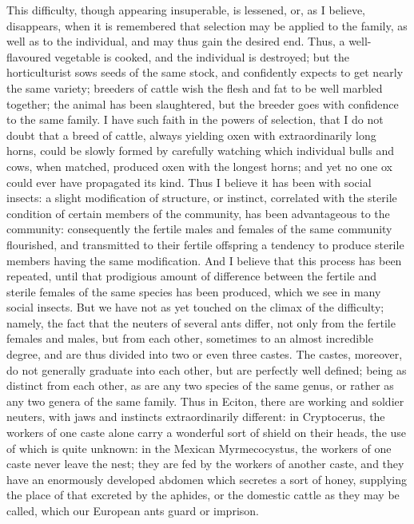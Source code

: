 This difficulty, though appearing insuperable, is lessened, or, as I believe, disappears, when it is remembered that selection may be applied to the family, as well as to the individual, and may thus gain the desired end. Thus, a well-flavoured vegetable is cooked, and the individual is destroyed; but the horticulturist sows seeds of the same stock, and confidently expects to get nearly the same variety; breeders of cattle wish the flesh and fat to be well marbled together; the animal has been slaughtered, but the breeder goes with confidence to the same family. I have such faith in the powers of selection, that I do not doubt that a breed of cattle, always yielding oxen with extraordinarily long horns, could be slowly formed by carefully watching which individual bulls and cows, when matched, produced oxen with the longest horns; and yet no one ox could ever have propagated its kind. Thus I believe it has been with social insects: a slight modification of structure, or instinct, correlated with the sterile condition of certain members of the community, has been advantageous to the community: consequently the fertile males and females of the same community flourished, and transmitted to their fertile offspring a tendency to produce sterile members having the same modification. And I believe that this process has been repeated, until that prodigious amount of difference between the fertile and sterile females of the same species has been produced, which we see in many social insects.
But we have not as yet touched on the climax of the difficulty; namely, the fact that the neuters of several ants differ, not only from the fertile females and males, but from each other, sometimes to an almost incredible degree, and are thus divided into two or even three castes. The castes, moreover, do not generally graduate into each other, but are perfectly well defined; being as distinct from each other, as are any two species of the same genus, or rather as any two genera of the same family. Thus in Eciton, there are working and soldier neuters, with jaws and instincts extraordinarily different: in Cryptocerus, the workers of one caste alone carry a wonderful sort of shield on their heads, the use of which is quite unknown: in the Mexican Myrmecocystus, the workers of one caste never leave the nest; they are fed by the workers of another caste, and they have an enormously developed abdomen which secretes a sort of honey, supplying the place of that excreted by the aphides, or the domestic cattle as they may be called, which our European ants guard or imprison.
